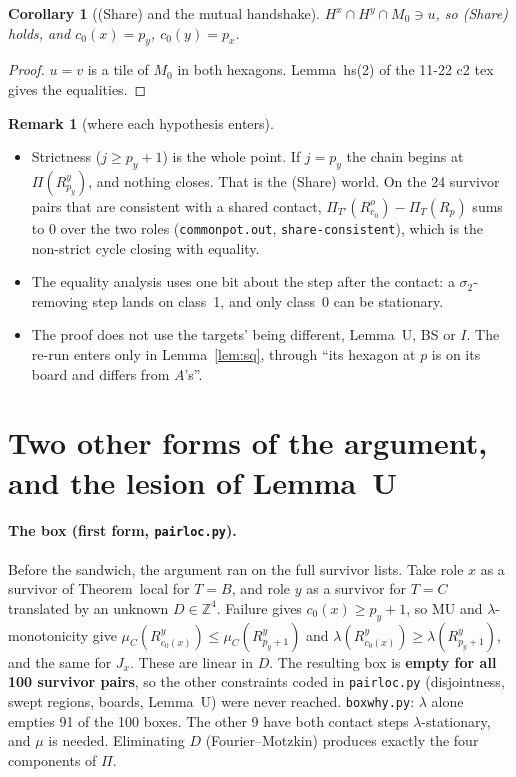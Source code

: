 \documentclass[11pt]{article}
\newtheorem{corollary}[theorem]{Corollary}
\theoremstyle{definition}\newtheorem{definition}[theorem]{Definition}\newtheorem{remark}[theorem]{Remark}
\newcommand{\Z}{\mathbb Z}
\begin{document}
\begin{corollary}[(Share) and the mutual handshake]\label{cor:share}
$H^x\cap H^y\cap M_0\ni u$, so (Share) holds, and $c_0(x)=p_y$, $c_0(y)=p_x$.
\end{corollary}
\begin{proof}
$u=v$ is a tile of $M_0$ in both hexagons. Lemma~hs(2) of the 11-22 c2 tex gives the equalities.
\end{proof}

\begin{remark}[where each hypothesis enters]
\begin{itemize}
\item Strictness ($j\ge p_y+1$) is the whole point. If $j=p_y$ the chain begins at $\Pi(R^y_{p_y})$, and nothing closes. That is the (Share) world. On the 24 survivor pairs that are consistent with a shared contact, $\Pi_{T'}(R^o_{c_0})-\Pi_T(R_p)$ sums to $0$ over the two roles (\texttt{commonpot.out}, \texttt{share-consistent}), which is the non-strict cycle closing with equality.
\item The equality analysis uses one bit about the step after the contact: a $\sigma_2$-removing step lands on class~1, and only class~0 can be stationary.
\item The proof does not use the targets' being different, Lemma~U, BS or $I$. The re-run enters only in Lemma~\ref{lem:sq}, through ``its hexagon at $p$ is on its board and differs from $A$'s''.
\end{itemize}
\end{remark}

\section{Two other forms of the argument, and the lesion of Lemma~U}\label{sec:box}\label{sec:lesion}
\paragraph{The box (first form, \texttt{pairloc.py}).} Before the sandwich, the argument ran on the full survivor lists. Take role $x$ as a survivor of Theorem~local for $T=B$, and role $y$ as a survivor for $T=C$ translated by an unknown $D\in\Z^4$. Failure gives $c_0(x)\ge p_y+1$, so MU and $\lambda$-monotonicity give $\mu_C(R^y_{c_0(x)})\le\mu_C(R^y_{p_y+1})$ and $\lambda(R^y_{c_0(x)})\ge\lambda(R^y_{p_y+1})$, and the same for $J_x$. These are linear in $D$. The resulting box is \textbf{empty for all 100 survivor pairs}, so the other constraints coded in \texttt{pairloc.py} (disjointness, swept regions, boards, Lemma~U) were never reached. \texttt{boxwhy.py}: $\lambda$ alone empties 91 of the 100 boxes. The other 9 have both contact steps $\lambda$-stationary, and $\mu$ is needed. Eliminating $D$ (Fourier--Motzkin) produces exactly the four components of $\Pi$.
\end{document}
